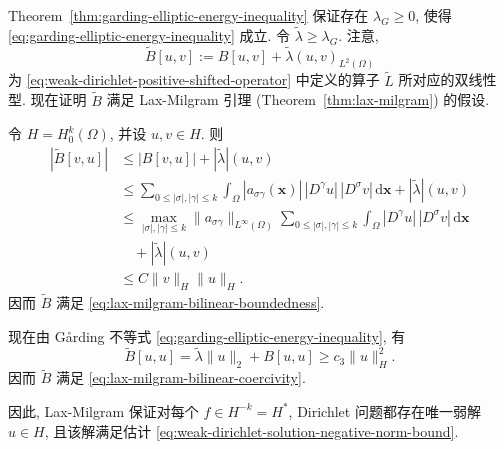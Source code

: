 \begin{Proof}
Theorem~\ref{thm:garding-elliptic-energy-inequality} 保证存在 $\lambda_G\geq0$, 使得 \eqref{eq:garding-elliptic-energy-inequality} 成立. 令 $\widetilde\lambda\geq\lambda_G$. 注意,
\begin{equation}\label{eq:weak-dirichlet-shifted-bilinear-form}
\widetilde B[u,v]:=B[u,v]+\widetilde\lambda(u,v)_{L^2(\Omega)}
\end{equation}
为 \eqref{eq:weak-dirichlet-positive-shifted-operator} 中定义的算子 $\widetilde L$ 所对应的双线性型. 现在证明 $\widetilde B$ 满足 Lax-Milgram 引理 (Theorem~\ref{thm:lax-milgram}) 的假设.

令 $H=H_0^k(\Omega)$, 并设 $u,v\in H$. 则\[\begin{aligned}
|\widetilde B[v,u]|&\leq|B[v,u]|+|\widetilde\lambda|(u,v)\\
&\leq\sum_{0\leq|\sigma|,|\gamma|\leq k}\int_\Omega|a_{\sigma\gamma}(\bm{x})|\,|D^\gamma u|\,|D^\sigma v|\,\mathrm{d}\bm{x}+|\widetilde\lambda|(u,v)\\
&\leq\max_{|\sigma|,|\gamma|\leq k}\|a_{\sigma\gamma}\|_{L^\infty(\Omega)}
\sum_{0\leq|\sigma|,|\gamma|\leq k}\int_\Omega|D^\gamma u|\,|D^\sigma v|\,\mathrm{d}\bm{x}\\
&\quad+|\widetilde\lambda|(u,v)\\
&\leq C\|v\|_H\|u\|_H.
\end{aligned}\]因而 $\widetilde B$ 满足 \eqref{eq:lax-milgram-bilinear-boundedness}.

现在由 Gårding 不等式 \eqref{eq:garding-elliptic-energy-inequality}, 有
\begin{equation}\label{eq:weak-dirichlet-shifted-form-coercivity}
\widetilde B[u,u]=\widetilde\lambda\|u\|_2+B[u,u]\geq c_3\|u\|_H^2.
\end{equation}
因而 $\widetilde B$ 满足 \eqref{eq:lax-milgram-bilinear-coercivity}.

因此, Lax-Milgram 保证对每个 $f\in H^{-k}=H^*$, Dirichlet 问题都存在唯一弱解 $u\in H$, 且该解满足估计 \eqref{eq:weak-dirichlet-solution-negative-norm-bound}.
\end{Proof}
